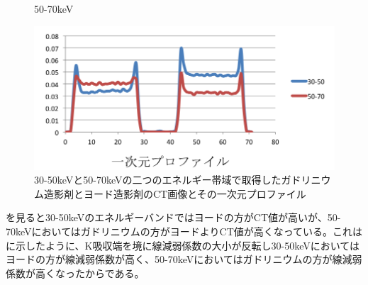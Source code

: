 \begin{figure}[H]
\begin{minipage}{0.5\hsize}
\begin{center}
  \end{center}
    \vspace{-1cm}
  \caption*{50-70keV}
 \end{minipage}
  \begin{minipage}{0.5\hsize}
     \hspace{3.5cm}
 \includegraphics[bb=0.000000 0.000000 411.805957 197.263693,width=1.4\hsize]{image2/chapter5/hanten_profile.png} 
 \end{minipage}
 \begin{center}
  \caption{30-50keVと50-70keVの二つのエネルギー帯域で取得したガドリニウム造影剤とヨード造影剤のCT画像とその一次元プロファイル}
  \label{fig:hanten}
  \end{center}
\end{figure}

を見ると30-50keVのエネルギーバンドではヨードの方がCT値が高いが、50-70keVにおいてはガドリニウムの方がヨードよりCT値が高くなっている。これはに示したように、K吸収端を境に線減弱係数の大小が反転し30-50keVにおいてはヨードの方が線減弱係数が高く、50-70keVにおいてはガドリニウムの方が線減弱係数が高くなったからである。







